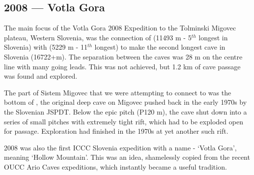 \begin{tcolorbox}
\chapter{2008 --- Votla Gora}

The main focus of the Votla Gora 2008 Expedition to the Tolminski
Migovec plateau, Western Slovenia, was the connection of 
(11493 m - 5\(^{th}\) longest in Slovenia) with  (5229 m
- 11\(^{th}\) longest) to make the second longest cave in Slovenia
(16722+m). The separation between the caves was 28 m on the centre line
with many going leads. This was not achieved, but 1.2 km of cave passage
was found and explored.

The part of Sistem Migovec that we were attempting to connect to was the
bottom of , the original deep cave on Migovec pushed back in
the early 1970s by the Slovenian JSPDT. Below the epic  pitch (P120 m), the cave shut down into a series of small pitches
with extremely tight rift, which had to be exploded open for passage.
Exploration had finished in the 1970s at yet another such rift.

2008 was also the first ICCC Slovenia expedition with a name - `Votla
Gora', meaning `Hollow Mountain'. This was an idea, shamelessly copied
from the recent OUCC Ario Caves expeditions, which instantly became a
useful tradition.

\end{tcolorbox}
